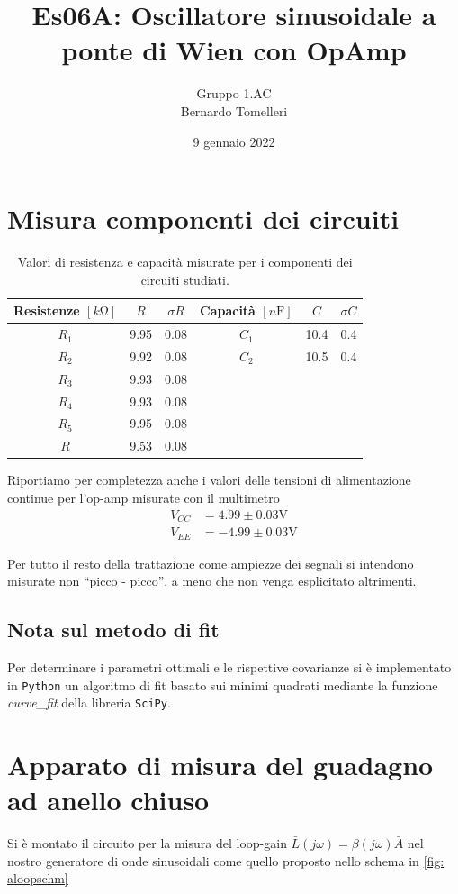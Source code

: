 \documentclass[10pt, a4paper, italian]{article}
\author{Gruppo 1.AC \\ Bernardo Tomelleri}
\title{Es06A: Oscillatore sinusoidale a ponte di Wien con OpAmp}
\begin{document}
\date{9 gennaio 2022}
\maketitle

\tableofcontents
\section{Misura componenti dei circuiti}
\begin{table}[htbp]
\centering
\begin{tabular}{cccccc}
\toprule
Resistenze $[\si{k\ohm}]$ & $R$ & $\sigma R$ & Capacità $[\si{n\F}]$ & $C$ &
$\sigma C$ \\
\midrule
\midrule
$R_1$	  & 9.95	& 0.08	 & $C_1$ & 10.4		 & 0.4 \\
$R_2$	  & 9.92	& 0.08 	 & $C_2$ & 10.5		 & 0.4 \\
$R_3$	  & 9.93	& 0.08	 & & & \\
$R_4$	  & 9.93	& 0.08	 & & & \\
$R_5$	  & 9.95	& 0.08	 & & & \\
$R$		  & 9.53	& 0.08	 & & & \\
\bottomrule     
\end{tabular}
\caption{Valori di resistenza e capacità misurate per i componenti dei
circuiti studiati. \label{tab: rcmes}}
\end{table}

Riportiamo per completezza anche i valori delle tensioni di alimentazione
continue per l'op-amp misurate con il multimetro
\begin{align*}
V_{CC} &= 4.99 \pm 0.03 \si{\V} \\
V_{EE} &= -4.99 \pm 0.03 \si{\V}
\end{align*}

Per tutto il resto della trattazione come ampiezze dei segnali si intendono
misurate non ``picco - picco'', a meno che non venga esplicitato altrimenti.

\subsection{Nota sul metodo di fit}
Per determinare i parametri ottimali e le rispettive covarianze si \`e
implementato in \verb+Python+ un algoritmo di fit basato sui minimi quadrati
mediante la funzione \emph{curve\_fit} della libreria \texttt{SciPy}.

\section{Apparato di misura del guadagno ad anello chiuso}
Si è montato il circuito per la misura del loop-gain
$\bar{L}(j\omega) = \beta(j\omega) \bar{A}$ nel nostro generatore di
onde sinusoidali come quello proposto nello schema in \cref{fig: aloopschm}
\end{document}
